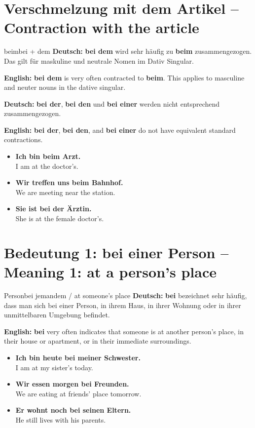 \documentclass[a4paper,11pt]{article}
\newcommand{\GermanText}[1]{\textbf{Deutsch: }#1\par}
\newcommand{\EnglishText}[1]{{\small\color{SoftGray}\textbf{English: }#1\par}}
\newcommand{\ExampleItem}[2]{\item \textbf{#1}\\{\small\color{SoftGray}#2}}
\begin{document}
\section{Verschmelzung mit dem Artikel -- Contraction with the article}
\begin{grammarentry}{beim}{bei + dem}
\GermanText{\textbf{bei dem} wird sehr häufig zu \textbf{beim} zusammengezogen. Das gilt für maskuline und neutrale Nomen im Dativ Singular.}
\EnglishText{\textbf{bei dem} is very often contracted to \textbf{beim}. This applies to masculine and neuter nouns in the dative singular.}
\GermanText{\textbf{bei der}, \textbf{bei den} und \textbf{bei einer} werden nicht entsprechend zusammengezogen.}
\EnglishText{\textbf{bei der}, \textbf{bei den}, and \textbf{bei einer} do not have equivalent standard contractions.}
\end{grammarentry}
\begin{exbox}\begin{itemize}
\ExampleItem{Ich bin beim Arzt.}{I am at the doctor's.}
\ExampleItem{Wir treffen uns beim Bahnhof.}{We are meeting near the station.}
\ExampleItem{Sie ist bei der Ärztin.}{She is at the female doctor's.}
\end{itemize}\end{exbox}

\section{Bedeutung 1: bei einer Person -- Meaning 1: at a person's place}
\begin{grammarentry}{Person}{bei jemandem / at someone's place}
\GermanText{\textbf{bei} bezeichnet sehr häufig, dass man sich bei einer Person, in ihrem Haus, in ihrer Wohnung oder in ihrer unmittelbaren Umgebung befindet.}
\EnglishText{\textbf{bei} very often indicates that someone is at another person's place, in their house or apartment, or in their immediate surroundings.}
\end{grammarentry}
\begin{exbox}\begin{itemize}
\ExampleItem{Ich bin heute bei meiner Schwester.}{I am at my sister's today.}
\ExampleItem{Wir essen morgen bei Freunden.}{We are eating at friends' place tomorrow.}
\ExampleItem{Er wohnt noch bei seinen Eltern.}{He still lives with his parents.}
\end{itemize}\end{exbox}
\end{document}
